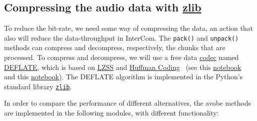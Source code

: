 \subsection{Compressing the audio data with \href{https://zlib.net/}{zlib}}
To reduce the bit-rate, we need some way of compressing the data, an
action that also will reduce the data-throughput in InterCom. The
\verb|pack()| and \verb|unpack()| methods can compress and
decompress, respectively, the chunks that are processed. To compress
and decompress, we will use a free data
\href{https://en.wikipedia.org/wiki/Codec}{codec} named
\href{https://en.wikipedia.org/wiki/DEFLATE}{DEFLATE}, which is based
on
\href{https://en.wikipedia.org/wiki/Lempel%E2%80%93Ziv%E2%80%93Storer%E2%80%93Szymanski}{LZSS}
  and \href{https://en.wikipedia.org/wiki/Huffman_coding}{Huffman
    Coding}~\cite{nelson96datacompression} (see this
  \href{https://github.com/vicente-gonzalez-ruiz/LZ77/blob/master/index.ipynb}{notebook} and
  this
  \href{https://github.com/vicente-gonzalez-ruiz/Huffman_coding/blob/master/index.ipynb}{notebook}). The
  DEFLATE algorithm is implemented in the Python's standard library
  \href{https://docs.python.org/3/library/zlib.html}{\texttt{zlib}}. %

In order to compare the performance of different alternatives, the
avobe methods are implemented in the following modules, with different
functionality:

